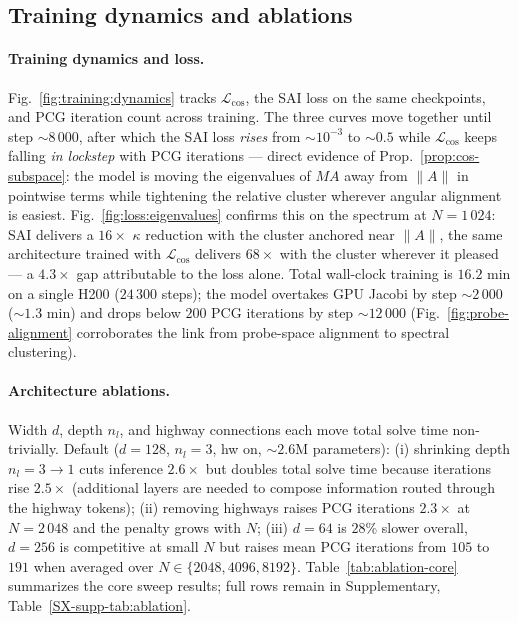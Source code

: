 \documentclass[acmtog,anonymous,review]{acmart}
\theoremstyle{plain}
\begin{document}
\subsection{Training dynamics and ablations}
\label{sec:results:training}

\paragraph{Training dynamics and loss.}
Fig.~\ref{fig:training:dynamics} tracks $\mathcal{L}_{\cos}$, the SAI loss on the same
checkpoints, and PCG iteration count across training. The three curves move together
until step $\sim\!8\,000$, after which the SAI loss \emph{rises} from $\sim\!10^{-3}$
to $\sim\!0.5$ while $\mathcal{L}_{\cos}$ keeps falling \emph{in lockstep} with PCG
iterations --- direct evidence of Prop.~\ref{prop:cos-subspace}: the model is moving
the eigenvalues of $MA$ away from $\|A\|$ in pointwise terms while tightening the
relative cluster wherever angular alignment is easiest. Fig.~\ref{fig:loss:eigenvalues}
confirms this on the spectrum at $N\!=\!1\,024$: SAI delivers a $16\times$ $\kappa$
reduction with the cluster anchored near $\|A\|$, the same architecture trained with
$\mathcal{L}_{\cos}$ delivers $68\times$ with the cluster wherever it pleased
--- a $4.3\times$ gap attributable to the loss alone. Total wall-clock training is
$16.2$ min on a single H200 ($24\,300$ steps); the model overtakes GPU Jacobi by
step $\sim\!2\,000$ ($\sim\!1.3$ min) and drops below $200$ PCG iterations by
step $\sim\!12\,000$ (Fig.~\ref{fig:probe-alignment} corroborates
the link from probe-space alignment to spectral clustering).

\paragraph{Architecture ablations.}
Width $d$, depth $n_l$, and highway connections each move total solve time
non-trivially. Default ($d\!=\!128$, $n_l\!=\!3$, hw on, $\sim\!2.6$M parameters):
(i) shrinking depth $n_l\!=\!3\!\to\!1$ cuts inference $2.6\times$ but doubles total
solve time because iterations rise $2.5\times$ (additional layers are needed to
compose information routed through the highway tokens); (ii) removing highways raises
PCG iterations $2.3\times$ at $N\!=\!2\,048$ and the penalty grows with $N$; (iii)
$d\!=\!64$ is $28\%$ slower overall, $d\!=\!256$ is competitive at small $N$ but
raises mean PCG iterations from $105$ to $191$ when averaged over
$N\!\in\!\{2048,4096,8192\}$. Table~\ref{tab:ablation-core} summarizes
the core sweep results; full rows remain in Supplementary, Table~\ref{SX-supp-tab:ablation}.
\end{document}

